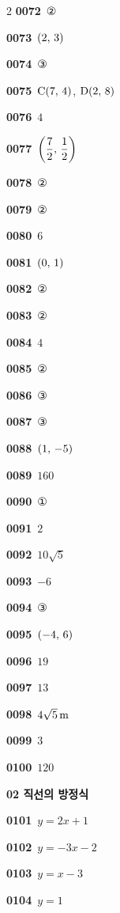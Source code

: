 \documentclass[10pt,a4paper]{article}
\newcommand{\pt}[1]{\mathrm{#1}}
\begin{document}
\begin{multicols}{2}
\noindent\textbf{0072}\ ②\par
\noindent\textbf{0073}\ $(2,\mkern3mu 3)$\par
\noindent\textbf{0074}\ ③\par
\noindent\textbf{0075}\ $\pt{C}(7,\mkern3mu 4)$, $\pt{D}(2,\mkern3mu 8)$\par
\noindent\textbf{0076}\ $4$\par
\noindent\textbf{0077}\ $\left(\dfrac{7}{2},\mkern3mu \dfrac{1}{2}\right)$\par
\noindent\textbf{0078}\ ②\par
\noindent\textbf{0079}\ ②\par
\noindent\textbf{0080}\ $6$\par
\noindent\textbf{0081}\ $(0,\mkern3mu 1)$\par
\noindent\textbf{0082}\ ②\par
\noindent\textbf{0083}\ ②\par
\noindent\textbf{0084}\ $4$\par
\noindent\textbf{0085}\ ②\par
\noindent\textbf{0086}\ ③\par
\noindent\textbf{0087}\ ③\par
\noindent\textbf{0088}\ $(1,\mkern3mu -5)$\par
\noindent\textbf{0089}\ $160$\par
\noindent\textbf{0090}\ ①\par
\noindent\textbf{0091}\ $2$\par
\noindent\textbf{0092}\ $10\sqrt{5}$\par
\noindent\textbf{0093}\ $-6$\par
\noindent\textbf{0094}\ ③\par
\noindent\textbf{0095}\ $(-4,\mkern3mu 6)$\par
\noindent\textbf{0096}\ $19$\par
\noindent\textbf{0097}\ $13$\par
\noindent\textbf{0098}\ $4\sqrt{5}\mkern3mu \mathrm{m}$\par
\noindent\textbf{0099}\ $3$\par
\noindent\textbf{0100}\ $120$\par
\noindent\textbf{02 직선의 방정식}\par\smallskip
\noindent\textbf{0101}\ $y=2x+1$\par
\noindent\textbf{0102}\ $y=-3x-2$\par
\noindent\textbf{0103}\ $y=x-3$\par
\noindent\textbf{0104}\ $y=1$\par

\end{multicols}
\end{document}
